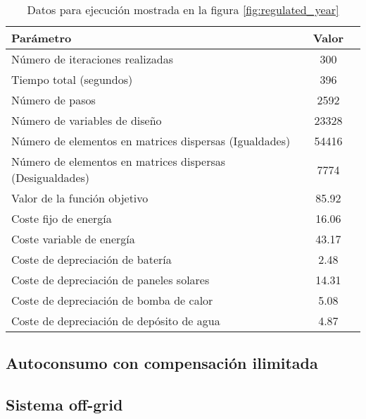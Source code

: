 \begin{table}[ht]
	\centering
	\caption{Datos para ejecución mostrada en la figura \ref{fig:regulated_year}}
	\label{tab:regulated_year}
	\begin{tabular}{@{}lcc@{}}
		\toprule
		Parámetro                                                 & Valor \\
		\midrule
		Número de iteraciones realizadas                          & 300   \\
		Tiempo total (segundos)                                   & 396   \\
		Número de pasos                                           & 2592  \\
		Número de variables de diseño                             & 23328 \\
		Número de elementos en matrices dispersas (Igualdades)    & 54416 \\
		Número de elementos en matrices dispersas (Desigualdades) & 7774  \\
		\midrule
		Valor de la función objetivo                              & 85.92 \\
		\midrule
		Coste fijo de energía                                     & 16.06 \\
		Coste variable de energía                                 & 43.17 \\
		Coste de depreciación de batería                          & 2.48  \\
		Coste de depreciación de paneles solares                  & 14.31 \\
		Coste de depreciación de bomba de calor                   & 5.08  \\
		Coste de depreciación de depósito de agua                 & 4.87  \\
		\bottomrule
	\end{tabular}
\end{table}


\clearpage
\subsection{Autoconsumo con compensación ilimitada}

\clearpage
\subsection{Sistema off-grid}
